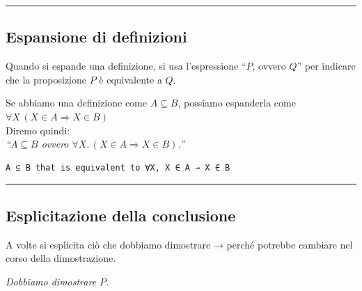 \documentclass[
  a4paper,
]{article}
\begin{document}
\par\noindent\rule{\linewidth}{0.4pt}\par\vspace{6pt}

\hypertarget{espansione-di-definizioni}{%
\subsection{Espansione di definizioni}\label{espansione-di-definizioni}}

Quando si espande una definizione, si usa l'espressione ``\(P\), ovvero
\(Q\)'' per indicare che la proposizione \(P\) è equivalente a \(Q\).

\begin{examplebox}[Esempio]

Se abbiamo una definizione come \(A \subseteq B\), possiamo espanderla
come \(\forall X\, (X \in A \Rightarrow X \in B)\)\\
Diremo quindi:\\
\emph{``\(A \subseteq B\) ovvero
\(\forall X.\,(X \in A \Rightarrow X \in B)\).''}

\end{examplebox}

\begin{examplebox}

\begin{lstlisting}
A ⊆ B that is equivalent to ∀X, X ∈ A → X ∈ B
\end{lstlisting}

\end{examplebox}

\par\noindent\rule{\linewidth}{0.4pt}\par\vspace{6pt}

\hypertarget{esplicitazione-della-conclusione}{%
\subsection{Esplicitazione della
conclusione}\label{esplicitazione-della-conclusione}}

A volte si esplicita ciò che dobbiamo dimostrare → perché potrebbe
cambiare nel corso della dimostrazione.

\begin{examplebox}[Esempio]

\emph{Dobbiamo dimostrare \(P\).}

\end{examplebox}
\end{document}
